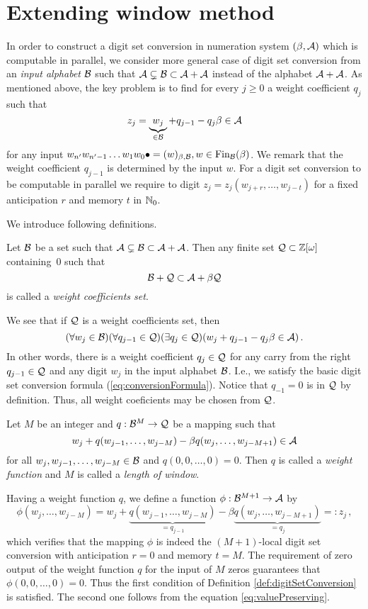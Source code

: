 \section{Extending window method}
\label{sec:methodDescription}
In order to construct a digit set conversion in numeration system $(\beta,\mathcal{A})$ which is computable in parallel, we consider more general case of digit set conversion from an \emph{input alphabet} $\mathcal{B}$ such that $\mathcal{A} \subsetneq \mathcal{B} \subset \mathcal{A} +\mathcal{A}$ instead of the alphabet $\mathcal{A}+\mathcal{A}$.
As mentioned above, the key problem is to find for every $j\geq 0$ a weight coefficient $q_j$ such that 
    $$
        z_j=\underbrace{w_j}_{\in \mathcal{B}} + q_{j-1} - q_j \beta \in \mathcal{A} 
    $$  
    for any input $w_{n'}w_{n'-1}\dots w_1 w_0 \bullet=(w)_{\beta,\mathcal{B}}, w\in \text{Fin}_{\mathcal{B}}(\beta)$. We remark that the weight coefficient $q_{j-1}$ is determined by the input $w$. For a digit set conversion to be computable in parallel we require to digit $z_j=z_j(w_{j+r},\dots,w_{j-t})$ for a fixed anticipation $r$ and memory $t$ in $\mathbb{N}_0$.
    
    We introduce following definitions. 
    \begin{defn}
    \label{def:weightCoefficientsSet}
        Let $\mathcal{B}$ be a set such that $\mathcal{A} \subsetneq \mathcal{B} \subset \mathcal{A} +\mathcal{A}$. Then any finite set $\mathcal{Q}\subset\mathbb{Z}[\omega]$ containing~0 such that 
        $$
            \mathcal{B} + \mathcal{Q} \subset \mathcal{A} + \beta \mathcal{Q}
        $$  
        is called a \emph{weight coefficients set}.
    \end{defn}
    We see that if $\mathcal{Q}$ is a weight coefficients set, then
        $$
        (\forall w_j \in \mathcal{B})(\forall q_{j-1}\in\mathcal{Q})(\exists q_j \in \mathcal{Q} )(w_j + q_{j-1} - q_j \beta \in \mathcal{A} )\,.
        $$
    In other words, there is a weight coefficient $q_j \in \mathcal{Q}$ for any carry from the right $q_{j-1}\in \mathcal{Q}$ and any digit $w_j$ in the input alphabet $\mathcal{B}$. I.e., we  satisfy the basic digit set conversion formula (\ref{eq:conversionFormula}). Notice that $q_{-1}=0$ is in $\mathcal{Q}$ by definition. Thus, all weight coeficients may be chosen from $\mathcal{Q}$.
    \begin{defn}
    Let $M$ be an integer and $q:\mathcal{B}^{M} \rightarrow \mathcal{Q}$ be a mapping such that 
    $$
    w_j+ q(w_{j-1}, \dots, w_{j-M}) - \beta q(w_j, \dots, w_{j-M+1}) \in \mathcal{A}
    $$
    for all $w_j,w_{j-1}, \dots, w_{j-M} \in \mathcal{B}$ and $q(0,0,\dots,0)=0$. Then $q$ is called a \emph{weight function} and $M$ is called a \emph{length of window}.    
    \end{defn}

 Having a weight function $q$, we define a function $\phi:\mathcal{B}^{M+1}\rightarrow \mathcal{A}$ by
    $$
        \phi(w_{j}, \dots, w_{j-M})=w_j+ \underbrace{q(w_{j-1}, \dots, w_{j-M})}_{=q_{j-1}} - \beta \underbrace{q(w_j, \dots, w_{j-M+1})}_{=q_j}=:z_j\,,
    $$ 
    which verifies that the mapping $\phi$ is indeed the $(M+1)$-local digit set conversion with anticipation $r=0$ and memory $t=M$. The requirement of zero output of the weight function $q$ for the input of $M$ zeros guarantees that $\phi(0,0,\dots,0)=0$. Thus the first condition of Definition \ref{def:digitSetConversion} is satisfied. The second one follows from the equation \ref{eq:valuePreserving}. 
    
